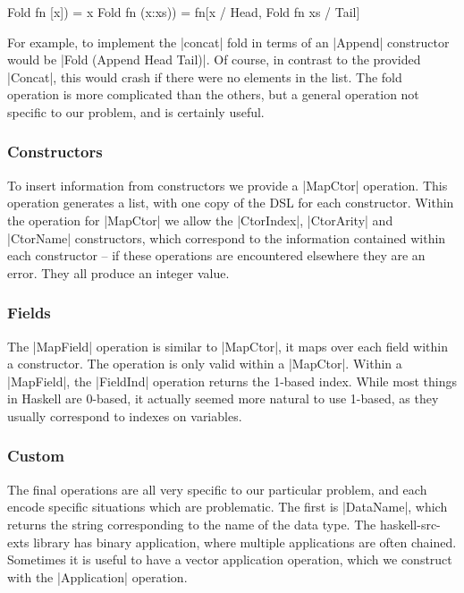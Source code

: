 \documentclass[preprint]{sigplanconf}
\begin{document}
\ignore\begin{code}
Fold fn [x]) = x
Fold fn (x:xs)) = fn[x / Head, Fold fn xs / Tail]
\end{code}

For example, to implement the |concat| fold in terms of an |Append| constructor would be |Fold (Append Head Tail)|. Of course, in contrast to the provided |Concat|, this would crash if there were no elements in the list. The fold operation is more complicated than the others, but a general operation not specific to our problem, and is certainly useful.

\subsubsection{Constructors}

To insert information from constructors we provide a |MapCtor| operation. This operation generates a list, with one copy of the DSL for each constructor. Within the operation for |MapCtor| we allow the |CtorIndex|, |CtorArity| and |CtorName| constructors, which correspond to the information contained within each constructor -- if these operations are encountered elsewhere they are an error. They all produce an integer value.

\subsubsection{Fields}

The |MapField| operation is similar to |MapCtor|, it maps over each field within a constructor. The operation is only valid within a |MapCtor|. Within a |MapField|, the |FieldInd| operation returns the 1-based index. While most things in Haskell are 0-based, it actually seemed more natural to use 1-based, as they usually correspond to indexes on variables.

\subsubsection{Custom}

The final operations are all very specific to our particular problem, and each encode specific situations which are problematic. The first is |DataName|, which returns the string corresponding to the name of the data type. The haskell-src-exts library has binary application, where multiple applications are often chained. Sometimes it is useful to have a vector application operation, which we construct with the |Application| operation.
\end{document}
